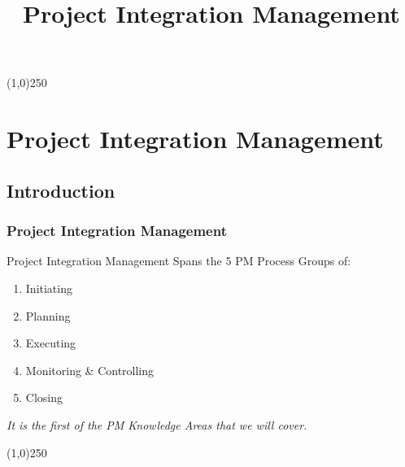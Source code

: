 

%
\title[Project Management]{Project Integration Management}
%



%

\tableofcontents
\newpage



\begin{frame}
\titlepage
\end{frame}\begin{center}\line(1,0){250}\end{center}
%
%








\section{Project Integration Management}

\subsection{Introduction}








\begin{frame}
\frametitle{Project Integration Management}
Project Integration Management Spans the 5 PM Process Groups of:
\begin{enumerate}
	\item Initiating
	\item Planning
	\item Executing
	\item Monitoring \& Controlling
	\item Closing
\end{enumerate}
\textit{It is the first of the PM Knowledge Areas that we will cover.}
\end{frame}\begin{center}\line(1,0){250}\end{center}
%
%


